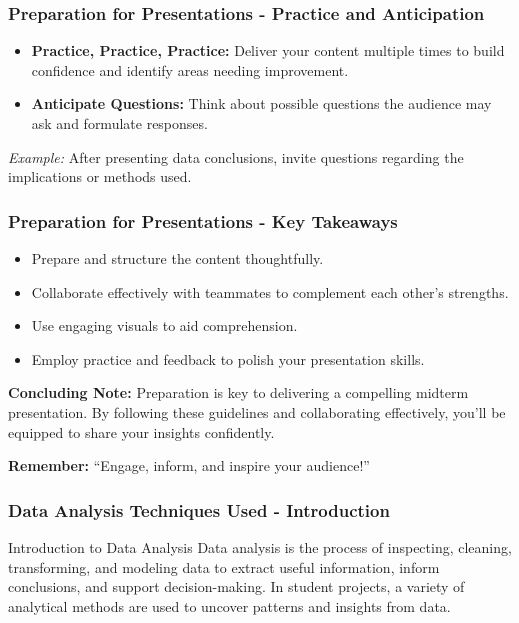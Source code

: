 \documentclass{beamer}
\begin{document}
\begin{frame}[fragile]
    \frametitle{Preparation for Presentations - Practice and Anticipation}
    \begin{itemize}
        \item \textbf{Practice, Practice, Practice:} Deliver your content multiple times to build confidence and identify areas needing improvement.
        \item \textbf{Anticipate Questions:} Think about possible questions the audience may ask and formulate responses.
    \end{itemize}
    \textit{Example:} After presenting data conclusions, invite questions regarding the implications or methods used.
\end{frame}

\begin{frame}[fragile]
    \frametitle{Preparation for Presentations - Key Takeaways}
    \begin{itemize}
        \item Prepare and structure the content thoughtfully.
        \item Collaborate effectively with teammates to complement each other's strengths.
        \item Use engaging visuals to aid comprehension.
        \item Employ practice and feedback to polish your presentation skills.
    \end{itemize}
    
    \textbf{Concluding Note:} Preparation is key to delivering a compelling midterm presentation. By following these guidelines and collaborating effectively, you'll be equipped to share your insights confidently. 
    
    \textbf{Remember:} ``Engage, inform, and inspire your audience!''
\end{frame}

\begin{frame}[fragile]
    \frametitle{Data Analysis Techniques Used - Introduction}
    \begin{block}{Introduction to Data Analysis}
        Data analysis is the process of inspecting, cleaning, transforming, and modeling data to extract useful information, inform conclusions, and support decision-making. In student projects, a variety of analytical methods are used to uncover patterns and insights from data.
    \end{block}
\end{frame}
\end{document}

